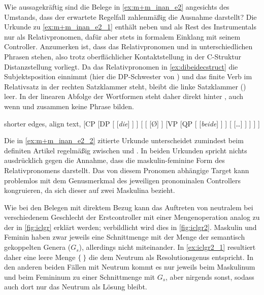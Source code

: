 Wie aussagekräftig sind die Belege in \cref{ex:m+m_inan_e2} angesichts des
Umstands, dass der erwartete Regelfall zahlenmäßig die Ausnahme darstellt? Die
Urkunde zu \cref{ex:m+m_inan_e2_1} enthält neben   und   \autocite[\pno~2401,
487.11, 17]{cao3} als Rest des Instrumentals \autocite[vgl.][618]{ksw2} nur
 als Relativpronomen, dafür aber stets in formalem Einklang mit
seinem Controller. Anzumerken ist, dass das Relativpronomen und
 in unterschiedlichen Phrasen stehen, also trotz
oberflächlicher Kontaktstellung in der C-Struktur Distanzstellung vorliegt. Da
das Relativpronomen in \cref{ex:dibeidecstruct} die Subjektsposition einnimmt
(hier die DP-Schwester von ) und das finite Verb im Relativsatz in der
rechten Satzklammer steht, bleibt die linke Satzklammer () leer. In
der linearen Abfolge der Wortformen steht daher  direkt hinter
, auch wenn  und  zusammen keine Phrase bilden.

\begin{exe}
\ex \label{ex:dibeidecstruct}
	\begin{forest} shorter edges, align text,
	[CP
		[DP
			[
				[\textit{die}]
			]
		]
		[
			[
				[Ø]
			]
			[VP
				[QP
					[
						[\textit{beide}]
					]
				]
				[
					[\dots]
				]
			]
		]
	]
	\end{forest}
\end{exe}

Die in \cref{ex:m+m_inan_e2_2} zitierte Urkunde unterscheidet zumindest beim
definiten Artikel regelmäßig zwischen  und . In beiden
Urkunden spricht nichts ausdrücklich gegen die Annahme, dass  die maskulin-feminine Form des Relativpronomens darstellt. Das
von diesem Pronomen abhängige Target  kann problemlos mit dem
Genusmerkmal des jeweiligen pronominalen Controllers kongruieren, da sich
dieser auf zwei Maskulina bezieht.

Wie bei den Belegen mit direktem Bezug kann das Auftreten von neutralem
 bei verschiedenem Geschlecht der Erstcontroller mit einer
Mengenoperation analog zu der in \cref{fig:iclgr} erklärt werden; verbildlicht
wird dies in \cref{fig:iclgr2}. Maskulin und Feminin haben zwar jeweils eine
Schnittmenge mit der Menge der semantisch gekoppelten Genera ($G_s$),
allerdings nicht miteinander. In \cref{ex:iclgr2_1} resultiert daher eine leere
Menge $\{\ \}$ die dem Neutrum als Resolutionsgenus entspricht. In den anderen
beiden Fällen mit Neutrum  kommt es nur
jeweils beim Maskulinum und beim Femininum zu einer Schnittmenge mit $G_s$,
aber nirgends sonst, sodass auch dort nur das Neutrum als Lösung bleibt.


